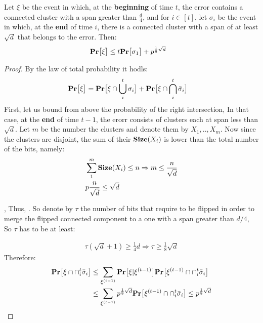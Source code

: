 \begin{claim}  
  Let $\xi$ be the event in which, at the \textbf{beginning} of time $t$, the error contains a connected cluster with a span greater than $\frac{d}{4}$, and for $i \in [t]$, let $\sigma_{i}$ be the event in which, at the \textbf{end} of time $i$, there is a connected cluster with a span of at least $\sqrt{d}$ that belongs to the error. Then:
\begin{equation*}
  \begin{split}
    & \mathbf{Pr} \big[ \xi \big] \le t\mathbf{Pr} \big[  \sigma_{1}  \big] + p^{\frac{1}{8}\sqrt{d}}  
  \end{split}
\end{equation*}
\end{claim}
\begin{proof}
 By the law of total probability it hodls: 
\begin{equation*}
  \begin{split}
    \mathbf{Pr} \big[ \xi \big] & =  \mathbf{Pr} \big[ \xi \cap \bigcup^{t}_{i} \sigma_{i}  \big] +  \mathbf{Pr} \big[ \xi \cap \bigcap^{t}_{i} \bar{\sigma}_{i}  \big] 
  \end{split}
\end{equation*}
First, let us bound from above the probability of the right intersection, In that case, at the \textbf{end} of time $t-1$, the erorr consists of clusters each at span less than $\sqrt{d}$. Let $m$ be the number the clusters and denote them by $X_{1},..,X_{m}$. Now since the clusters are disjoint, the sum of their $\mathbf{Size}(X_{i})$ is lower than the total number of the bits, namely: 
\begin{equation*}
  \begin{split}
    & \sum_{1}^{m}\mathbf{Size}(X_{i} ) \le n \Rightarrow m \le \frac{n}{\sqrt{d}} \\
    & p \frac{n}{\sqrt{d}}  \le \sqrt{d}
  \end{split}
\end{equation*}

, Thus, .  So denote by $\tau$ the number of bits that require to be flipped in order to merge the flipped connected component to a one with a span greater than $d/4$, So $\tau$ has to be at least:   




\begin{equation*}
  \begin{split}
    \tau\left( \sqrt{d} + 1 \right) \ge \frac{1}{4} d \Rightarrow \tau \ge \frac{1}{8} \sqrt{d}
  \end{split}
\end{equation*}
Therefore: 
\begin{equation*}
  \begin{split}
    \mathbf{Pr} \big[ \xi \cap \cap^{t}_{i} \bar{\sigma}_{i}  \big] & \le \sum_{\xi^{(t-1)}} \mathbf{Pr} \big[ \xi | \xi^{(t-1)} \big]\mathbf{Pr} \big[ \xi^{(t-1)} \cap  \cap^{t}_{i} \bar{\sigma}_{i}  \big]  \\ 
    & \le \sum_{\xi^{(t-1)}} p^{\frac{1}{8} \sqrt{d}} \mathbf{Pr} \big[ \xi^{(t-1)} \cap  \cap^{t}_{i} \bar{\sigma}_{i}  \big] \le p^{\frac{1}{8} \sqrt{d}} 
  \end{split}
\end{equation*}



\end{proof}
